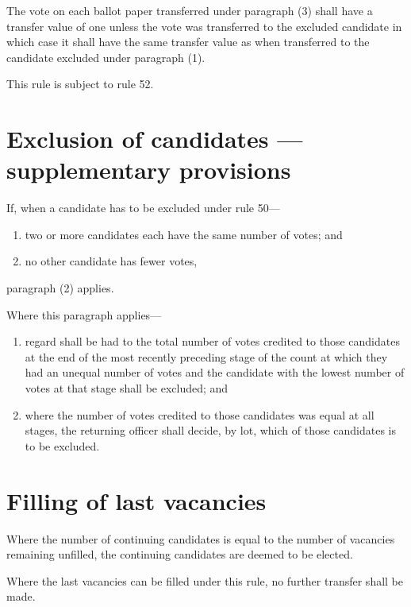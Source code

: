 \appnpara The vote on each ballot paper transferred under paragraph (3) shall have a transfer value of one unless the vote was transferred to the excluded candidate in which case it shall have the same transfer value as when transferred to the candidate excluded under paragraph (1).

\appnpara This rule is subject to rule 52.

\section{Exclusion of candidates — supplementary provisions}

\appnpara If, when a candidate has to be excluded under rule 50—
\begin{enumerate}
    \item two or more candidates each have the same number of votes; and
    \item no other candidate has fewer votes,
\end{enumerate}
paragraph (2) applies.

\appnpara Where this paragraph applies—
\begin{enumerate}
\DrawEnumitemLabel
    \item regard shall be had to the total number of votes credited to those candidates at the end of the most recently preceding stage of the count at which they had an unequal number of votes and the candidate with the lowest number of votes at that stage shall be excluded; and
    \item where the number of votes credited to those candidates was equal at all stages, the returning officer shall decide, by lot, which of those candidates is to be excluded.
\end{enumerate}

\section{Filling of last vacancies}

\appnpara Where the number of continuing candidates is equal to the number of vacancies remaining unfilled, the continuing candidates are deemed to be elected.

\appnpara Where the last vacancies can be filled under this rule, no further transfer shall be made.

